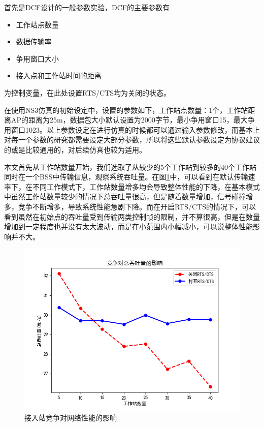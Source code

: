\documentclass{article}
\begin{document}
首先是DCF设计的一般参数实验，DCF的主要参数有

\begin{itemize}
	\item {工作站点数量}
	\item {数据传输率}
	\item {争用窗口大小}
	\item {接入点和工作站时间的距离}
\end{itemize}

为控制变量，在此处设置RTS/CTS均为关闭的状态。

在使用NS3仿真的初始设定中，设置的参数如下，工作站点数量：1个，工作站距离AP的距离为25m，数据包大小默认设置为2000字节，最小争用窗口15，最大争用窗口1023。以上参数设定在进行仿真的时候都可以通过输入参数修改，而基本上对每一个参数的研究都需要设定大部分参数，所以将这些默认参数设定为协议建议的或是比较通用的，对后续仿真也较为适用。

本文首先从工作站数量开始，我们选取了从较少的5个工作站到较多的40个工作站同时在一个BSS中传输信息，观察系统吞吐量。在图\ref{fig:contention}中，可以看到在默认传输速率下，在不同工作模式下，工作站数量增多均会导致整体性能的下降，在基本模式中虽然工作站数量较少的情况下总吞吐量很高，但是随着数量增加，信号碰撞增多，竞争不断增多，导致系统性能急剧下降。而在开启RTS/CTS的情况下，可以看到虽然在初始点的吞吐量受到传输两类控制帧的限制，并不算很高，但是在数量增加到一定程度也并没有太大波动，而是在小范围内小幅减小，可以说整体性能影响并不大。
\begin{figure}[ht]
	\centering
	\includegraphics[scale=0.6]{picture/contention.png}
	\caption{接入站竞争对网络性能的影响}
	\label{fig:contention}
\end{figure}
\end{document}
